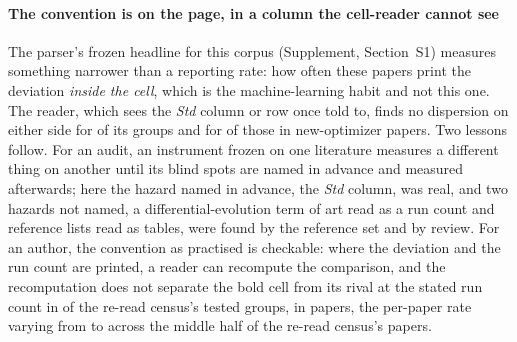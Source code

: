 \documentclass[preprint,review,12pt]{elsarticle}
\begin{document}
\paragraph{The convention is on the page, in a column the cell-reader cannot see} The parser's frozen headline for this corpus (Supplement, Section~S1) measures something narrower than a reporting rate: how often these papers print the deviation \emph{inside the cell}, which is the machine-learning habit and not this one. The reader, which sees the \emph{Std} column or row once told to, finds no dispersion on either side for \nCrcAllNeither{} of its groups and for \nCrcNewOptimizerNeither{} of those in new-optimizer papers. Two lessons follow. For an audit, an instrument frozen on one literature measures a different thing on another until its blind spots are named in advance and measured afterwards; here the hazard named in advance, the \emph{Std} column, was real, and two hazards not named, a differential-evolution term of art read as a run count and reference lists read as tables, were found by the reference set and by review. For an author, the convention as practised is checkable: where the deviation and the run count are printed, a reader can recompute the comparison, and the recomputation does not separate the bold cell from its rival at the stated run count in \nCrcAllFail{} of the re-read census's tested groups, in \nCrcAllTestedPapers{} papers, the per-paper rate varying from \nCrcPpQORate{} to \nCrcPpQTRate{} across the middle half of the re-read census's papers.
\end{document}
